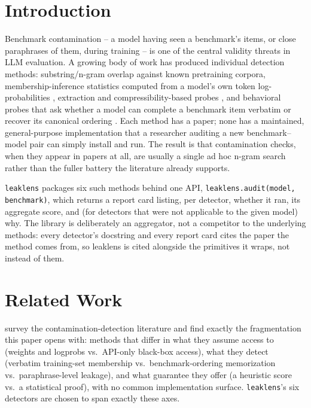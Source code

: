 \documentclass[11pt]{article}
\begin{document}
\section{Introduction}

Benchmark contamination -- a model having seen a benchmark's items, or
close paraphrases of them, during training -- is one of the central
validity threats in LLM evaluation. A growing body of work has produced
individual detection methods: substring/n-gram overlap against known
pretraining corpora, membership-inference statistics computed from a
model's own token log-probabilities \citep{shi2023detecting}, extraction
and compressibility-based probes \citep{carlini2021extracting}, and
behavioral probes that ask whether a model can complete a benchmark item
verbatim or recover its canonical ordering \citep{brown2020language}. Each
method has a paper; none has a maintained, general-purpose implementation
that a researcher auditing a new benchmark--model pair can simply install
and run. The result is that contamination checks, when they appear in
papers at all, are usually a single ad hoc n-gram search rather than the
fuller battery the literature already supports.

\texttt{leaklens} packages six such methods behind one API,
\texttt{leaklens.audit(model, benchmark)}, which returns a report card
listing, per detector, whether it ran, its aggregate score, and (for
detectors that were not applicable to the given model) why. The library
is deliberately an aggregator, not a competitor to the underlying methods:
every detector's docstring and every report card cites the paper the
method comes from, so leaklens is cited alongside the primitives it
wraps, not instead of them.

\section{Related Work}

\citet{xu2024benchmark} survey the contamination-detection literature and
find exactly the fragmentation this paper opens with: methods that
differ in what they assume access to (weights and logprobs vs.\ API-only
black-box access), what they detect (verbatim training-set membership vs.\
benchmark-ordering memorization vs.\ paraphrase-level leakage), and what
guarantee they offer (a heuristic score vs.\ a statistical proof), with no
common implementation surface. \texttt{leaklens}'s six detectors are
chosen to span exactly these axes.
\end{document}
